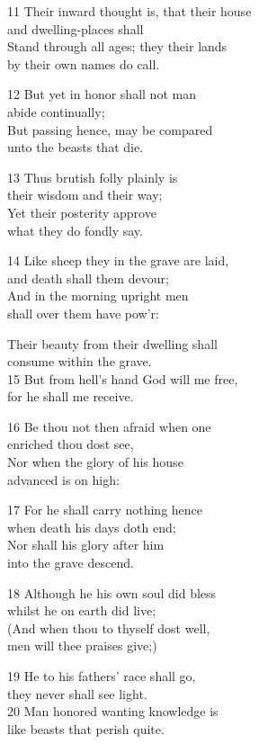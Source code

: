 11 Their inward thought is, that their house\\
and dwelling-places shall\\
Stand through all ages; they their lands\\
by their own names do call.

12 But yet in honor shall not man\\
abide continually;\\
But passing hence, may be compared\\
unto the beasts that die.

13 Thus brutish folly plainly is\\
their wisdom and their way;\\
Yet their posterity approve\\
what they do fondly say.

14 Like sheep they in the grave are laid,\\
and death shall them devour;\\
And in the morning upright men\\
shall over them have pow’r:

Their beauty from their dwelling shall\\
consume within the grave.\\
15 But from hell’s hand God will me free,\\
for he shall me receive.

16 Be thou not then afraid when one\\
enriched thou dost see,\\
Nor when the glory of his house\\
advanced is on high:

17 For he shall carry nothing hence\\
when death his days doth end;\\
Nor shall his glory after him\\
into the grave descend.

18 Although he his own soul did bless\\
whilst he on earth did live;\\
(And when thou to thyself dost well,\\
men will thee praises give;)

19 He to his fathers’ race shall go,\\
they never shall see light.\\
20 Man honored wanting knowledge is\\
like beasts that perish quite.

